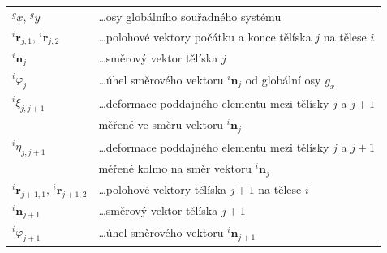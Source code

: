 \begin{tabular}{@{}ll}
	$^gx, \, ^gy$ &\dots osy globálního souřadného systému\\
	$ ^{i}\mathbf{r}_{j,1}, \, ^{i}\mathbf{r}_{j,2} $ &\dots polohové vektory počátku a konce tělíska $ j $ na tělese $ i $\\
	$ ^{i}\mathbf{n}_{j} $ &\dots směrový vektor tělíska $ j $\\
	$ ^{i}\varphi_{j} $ &\dots úhel směrového vektoru $ ^{i}\mathbf{n}_{j} $ od globální osy $ g_x $ \\
	$ ^{i}\xi_{j,j+1} $ &\dots deformace poddajného elementu mezi tělísky $ j $ a $ j+1 $ \\& měřené ve směru vektoru  $^{i}\mathbf{n}_{j} $\\
	$ ^{i}\eta_{j,j+1} $ &\dots deformace poddajného elementu mezi tělísky $ j $ a $ j+1 $ \\& měřené kolmo na směr vektoru  $^{i}\mathbf{n}_{j} $\\
	$ ^{i}\mathbf{r}_{j+1,1}, \, ^{i}\mathbf{r}_{j+1,2} $ &\dots polohové vektory tělíska $ j+1 $ na tělese $ i $\\
	$ ^{i}\mathbf{n}_{j+1} $ &\dots směrový vektor tělíska $ j+1 $\\
	$ ^{i}\varphi_{j+1} $ &\dots úhel směrového vektoru $ ^{i}\mathbf{n}_{j+1} $ \\
	
\end{tabular}

